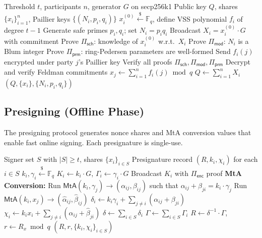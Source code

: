 \documentclass[11pt,twocolumn]{article}
\begin{document}
\begin{algorithm}[H]
\caption{CGGMP21 Distributed Key Generation}
\label{alg:cggmp-dkg}
\begin{algorithmic}[1]
\Require Threshold $t$, participants $n$, generator $G$ on secp256k1
\Ensure Public key $Q$, shares $\{x_i\}_{i=1}^n$, Paillier keys $\{(N_i, p_i, q_i)\}$
  \State $x_i^{(0)} \xleftarrow{\$} \mathbb{F}_q$, define VSS polynomial $f_i$ of degree $t-1$
  \State Generate safe primes $p_i, q_i$; set $N_i = p_i q_i$
  \State Broadcast $X_i = x_i^{(0)} \cdot G$ with commitment
  \State Prove $\Pi_{\mathsf{sch}}$: knowledge of $x_i^{(0)}$ w.r.t.\ $X_i$
  \State Prove $\Pi_{\mathsf{mod}}$: $N_i$ is a Blum integer
  \State Prove $\Pi_{\mathsf{prm}}$: ring-Pedersen parameters are well-formed
  \State Send $f_i(j)$ encrypted under party $j$'s Paillier key
\EndFor
{}
  \State Verify all proofs $\Pi_{\mathsf{sch}}, \Pi_{\mathsf{mod}}, \Pi_{\mathsf{prm}}$
  \State Decrypt and verify Feldman commitments
  \State $x_j \gets \sum_{i=1}^n f_i(j) \bmod q$
\EndFor
\State $Q \gets \sum_{i=1}^n X_i$
\State \Return $(Q, \{x_i\}, \{N_i, p_i, q_i\})$
\end{algorithmic}
\end{algorithm}

\subsection{Presigning (Offline Phase)}

The presigning protocol generates nonce shares and MtA conversion values that enable
fast online signing. Each presignature is single-use.

\begin{algorithm}[H]
\caption{CGGMP21 Presigning}
\label{alg:cggmp-presign}
\begin{algorithmic}[1]
\Require Signer set $S$ with $|S| \geq t$, shares $\{x_i\}_{i \in S}$
\Ensure Presignature record $(R, k_i, \chi_i)$ for each $i \in S$
  \State $k_i, \gamma_i \xleftarrow{\$} \mathbb{F}_q$
  \State $K_i \gets k_i \cdot G$, $\Gamma_i \gets \gamma_i \cdot G$
  \State Broadcast $K_i$ with $\Pi_{\mathsf{enc}}$ proof
\EndFor
\Statex \textbf{MtA Conversion:}
  \State Run $\mathsf{MtA}(k_i, \gamma_j) \to (\alpha_{ij}, \beta_{ij})$
  \State \quad such that $\alpha_{ij} + \beta_{ji} = k_i \cdot \gamma_j$
  \State Run $\mathsf{MtA}(k_i, x_j) \to (\hat{\alpha}_{ij}, \hat{\beta}_{ij})$
\EndFor
{}
  \State $\delta_i \gets k_i \gamma_i + \sum_{j \neq i} (\alpha_{ij} + \beta_{ji})$
  \State $\chi_i \gets k_i x_i + \sum_{j \neq i} (\hat{\alpha}_{ij} + \hat{\beta}_{ji})$
\EndFor
\State $\delta \gets \sum_{i \in S} \delta_i$ 
\State $\Gamma \gets \sum_{i \in S} \Gamma_i$ 
\State $R \gets \delta^{-1} \cdot \Gamma$, \; $r \gets R_x \bmod q$
\State \Return $(R, r, \{k_i, \chi_i\}_{i \in S})$
\end{algorithmic}
\end{algorithm}
\end{document}
